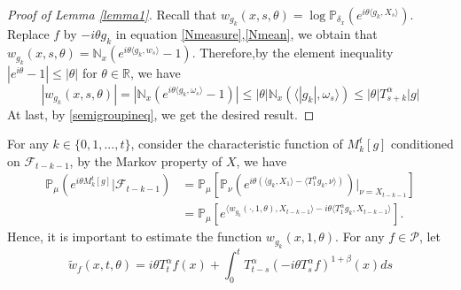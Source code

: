 \documentclass[12pt, a4paper]{amsart}
\theoremstyle{definition}
\numberwithin{equation}{section}
\begin{document}
\begin{proof}[Proof of Lemma \ref{lemma1}]

Recall that $w_{g_k}(x,s,\theta)=\log\mathbb{P}_{\delta_x}(e^{i\theta \langle g_k, X_s \rangle})$.
Replace $f$ by $-i\theta g_k$ in equation \eqref{Nmeasure},\eqref{Nmean}, we obtain that $w_{g_k}(x,s,\theta)=\mathbb{N}_x\left(e^{i\theta\langle g_k,w_s\rangle}-1\right)$.
Therefore,by the element inequality $|e^{i\theta}-1|\leq|\theta|$ for $\theta \in \mathbb{R}$, we have 
$$|w_{g_k}(x,s,\theta)|=|\mathbb{N}_x(e^{i\theta\langle g_{k},\omega_s \rangle}-1)|\leq |\theta|\mathbb{N}_x(\langle|g_k|,\omega_s\rangle)\leq|\theta|T_{s+k}^{\alpha}|g|$$
At last, by \eqref{semigroupineq}, we get the desired result.
\end{proof}
 For any $k \in \{0,1,...,t\}$, consider the characteristic function of $M^t_k[g]$ conditioned on $\mathcal{F}_{t-k-1}$, by the Markov property of $X$, we have
 \begin{align*}
      \mathbb{P}_{\mu}(e^{i\theta M_k^t[g]}|\mathcal{F}_{t-k-1}) &=\mathbb{P_{\mu}}\left [\mathbb{P}_{\nu}\left(e^{i\theta(\langle g_k,X_1\rangle-\langle T_1^{\alpha}g_k,\nu\rangle)}\right)|_{\nu=X_{t-k-1}}\right]   \\
      &=\mathbb{P}_{\mu}\left[ e^{\langle w_{g_k}(\cdot,1,\theta),X_{t-k-1}\rangle -i \theta\langle T_1^{\alpha}g_k,X_{t-k-1}\rangle}\right].
 \end{align*}
Hence, it is important to estimate the function $w_{g_k}(x,1,\theta)$. For any $f \in \mathcal{P}$, let 
\begin{equation}\label{w2function}
    \tilde{w}_{f}(x,t,\theta)=i\theta T^{\alpha}_t f(x) + \int_0^t T^{\alpha}_{t-s}(-i\theta T_s^{\alpha}f)^{1+\beta}(x)ds
\end{equation}
\end{document}
